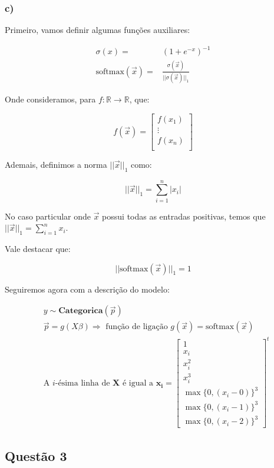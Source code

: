 \documentclass[
]{article}
\begin{document}
\hypertarget{c-1}{%
\subsubsection{c)}\label{c-1}}

Primeiro, vamos definir algumas funções auxiliares:

\[
\begin{aligned}
\sigma(x)=&(1+e^{-x})^{-1}\\
\text{softmax}(\vec{x})=&
\frac{\sigma(\vec{x})}{||\sigma(\vec{x})||_1}
\end{aligned}
\]

Onde consideramos, para \(f:\mathbb{R}\rightarrow \mathbb{R}\), que:

\[
f(\vec{x})=
\begin{bmatrix}
f(x_1)\\
\vdots\\
f(x_n)\\
\end{bmatrix}
\]

Ademais, definimos a norma \(||\vec{x}||_1\) como:

\[||\vec{x}||_1 = \sum_{i=1}^n|x_i|\]

No caso particular onde \(\vec{x}\) possui todas as entradas positivas,
temos que \(||\vec{x}||_1 = \sum_{i=1}^nx_i\).

Vale destacar que:

\[||\text{softmax}(\vec{x})||_1 =1\]

Seguiremos agora com a descrição do modelo:

\[
\begin{aligned}
&y \sim \textbf{Categorica}(\vec{p})\\
&\vec{p} = g(X\beta)\Rightarrow \text{ função de ligação }  g(\vec{x})=\text{softmax}(\vec{x})\\
&\text{A }i\text{-ésima linha de }\boldsymbol{X}\text{ é igual a }\boldsymbol{x_i}=
\begin{bmatrix}
1\\
x_i\\
x_i^2\\
x_i^3\\
\max\{0,(x_i-0)\}^3\\
\max\{0,(x_i-1)\}^3\\
\max\{0,(x_i-2)\}^3
\end{bmatrix}^t
\end{aligned}
\]

\hypertarget{questuxe3o-3}{%
\subsection{Questão 3}\label{questuxe3o-3}}
\end{document}
